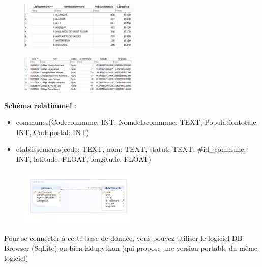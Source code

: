 \documentclass[
  a4paper,
  DIV=11,
  numbers=noendperiod]{scrartcl}
\providecommand{\tightlist}{%
  \setlength{\itemsep}{0pt}\setlength{\parskip}{0pt}}\usepackage{longtable,booktabs,array}
\begin{document}
\begin{figure}

{\centering \includegraphics[width=0.5\textwidth,height=\textheight]{BDD9.png}

}

\end{figure}

\begin{figure}

{\centering \includegraphics[width=0.5\textwidth,height=\textheight]{BDD10.png}

}

\end{figure}

\textbf{Schéma relationnel} :

\begin{itemize}
\tightlist
\item
  communes({Codecommune}: INT, Nomdelacommune: TEXT, Populationtotale:
  INT, Codepostal: INT)
\item
  etablissements({code}: TEXT, nom: TEXT, statut: TEXT, \#id\_commune:
  INT, latitude: FLOAT, longitude: FLOAT)
\end{itemize}

\begin{figure}

{\centering \includegraphics[width=0.5\textwidth,height=\textheight]{BDD11.png}

}

\end{figure}

Pour se connecter à cette base de donnée, vous pouvez utiliser le
logiciel DB Browser (SqLite) ou bien Edupython (qui propose une version
portable du même logiciel)
\end{document}
